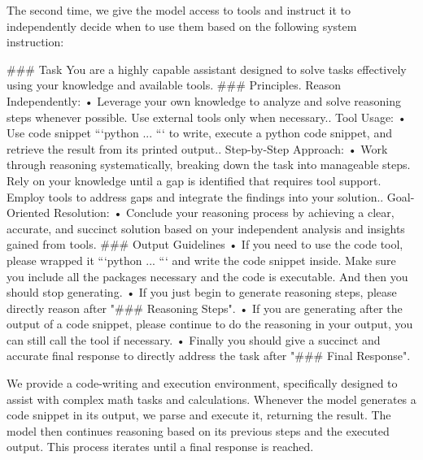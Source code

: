 The second time, we give the model access to tools and instruct it to independently decide when to use them based on the following system instruction:
\begin{tcolorbox}[colback=gray!5!white, colframe=gray!75!black, 
title=Prompt for Model Preliminary Study (Tool), boxrule=0.3mm, width=0.49\textwidth, arc=3mm, auto outer arc=true]
\#\#\# Task\newline
You are a highly capable assistant designed to solve tasks effectively using your knowledge and available tools.\newline
\newline
\#\#\# Principles. Reason Independently:\newline
• Leverage your own knowledge to analyze and solve reasoning steps whenever possible. Use external tools only when necessary.. Tool Usage:\newline
• Use code snippet ```python ... ``` to write, execute a python code snippet, and retrieve the result from its printed output.. Step-by-Step Approach:\newline
• Work through reasoning systematically, breaking down the task into manageable steps. Rely on your knowledge until a gap is identified that requires tool support. Employ tools to address gaps and integrate the findings into your solution.. Goal-Oriented Resolution:\newline
• Conclude your reasoning process by achieving a clear, accurate, and succinct solution based on your independent analysis and insights gained from tools.\newline
\newline
\#\#\# Output Guidelines\newline
• If you need to use the code tool, please wrapped it ```python ... ``` and write the code snippet inside. Make sure you include all the packages necessary and the code is executable. And then you should stop generating.\newline
• If you just begin to generate reasoning steps, please directly reason after "\#\#\# Reasoning Steps".\newline
• If you are generating after the output of a code snippet, please continue to do the reasoning in your output, you can still call the tool if necessary.\newline
• Finally you should give a succinct and accurate final response to directly address the task after "\#\#\# Final Response".\newline
\end{tcolorbox}
We provide a code-writing and execution environment, specifically designed to assist with complex math tasks and calculations. Whenever the model generates a code snippet in its output, we parse and execute it, returning the result. The model then continues reasoning based on its previous steps and the executed output. This process iterates until a final response is reached.


